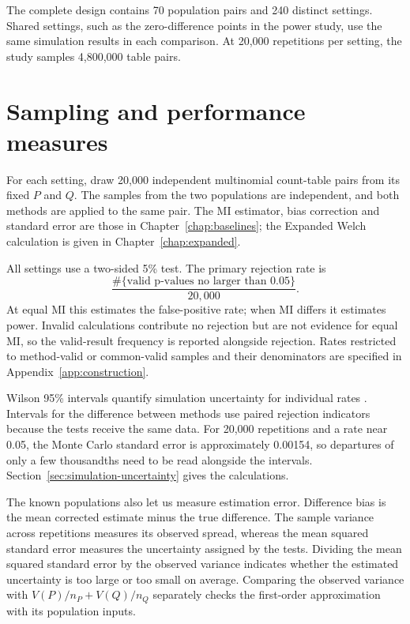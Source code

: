 The complete design contains 70 population pairs and 240 distinct settings.
Shared settings, such as the zero-difference points in the power study,
use the same simulation results in each comparison. At 20,000 repetitions
per setting, the study samples 4,800,000 table pairs.

\section{Sampling and performance measures}

For each setting, draw 20,000 independent multinomial count-table pairs
from its fixed \(P\) and \(Q\). The samples from the two populations are
independent, and both methods are applied to the same pair. The MI estimator,
bias correction and standard
error are those in Chapter~\ref{chap:baselines}; the Expanded Welch
calculation is given in Chapter~\ref{chap:expanded}.

All settings use a two-sided 5\% test. The primary rejection rate is
\begin{equation}
 \frac{\#\{\text{valid p-values no larger than }0.05\}}{20{,}000}.
 \label{eq:unconditional-rate}
\end{equation}
At equal MI this estimates the false-positive rate; when MI differs it
estimates power. Invalid calculations contribute no rejection but are not
evidence for equal MI, so the valid-result frequency is reported
alongside rejection. Rates restricted to method-valid or common-valid
samples and their denominators are specified in
Appendix~\ref{app:construction}.

Wilson 95\% intervals quantify simulation uncertainty for individual rates
\citep{wilson1927}. Intervals for the difference between methods use paired
rejection indicators because the tests receive the same data.
For 20,000 repetitions and a rate near 0.05, the Monte Carlo standard error
is approximately 0.00154, so departures of only a few thousandths need to
be read alongside the intervals. Section~\ref{sec:simulation-uncertainty}
gives the calculations.

\medskip
{}

The known populations also let us measure estimation error. Difference
bias is the mean corrected estimate minus the true difference. The sample
variance across repetitions measures its observed spread, whereas the mean
squared standard error measures the uncertainty assigned by the tests.
Dividing the mean squared standard error by the observed variance indicates
whether the estimated uncertainty is too large or too small on average.
Comparing the observed variance with
\(V(P)/n_P+V(Q)/n_Q\) separately checks the first-order approximation
with its population inputs.


